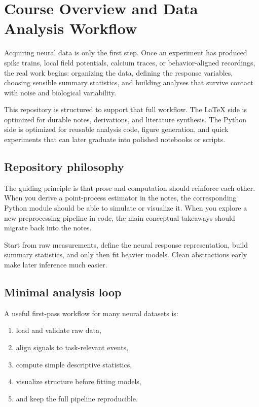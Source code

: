 \chapter{Course Overview and Data Analysis Workflow}

Acquiring neural data is only the first step. Once an experiment has produced spike trains, local field potentials, calcium traces, or behavior-aligned recordings, the real work begins: organizing the data, defining the response variables, choosing sensible summary statistics, and building analyses that survive contact with noise and biological variability.

This repository is structured to support that full workflow. The LaTeX side is optimized for durable notes, derivations, and literature synthesis. The Python side is optimized for reusable analysis code, figure generation, and quick experiments that can later graduate into polished notebooks or scripts.

\section{Repository philosophy}

The guiding principle is that prose and computation should reinforce each other. When you derive a point-process estimator in the notes, the corresponding Python module should be able to simulate or visualize it. When you explore a new preprocessing pipeline in code, the main conceptual takeaways should migrate back into the notes.

\begin{aside}
Start from raw measurements, define the neural response representation, build summary statistics, and only then fit heavier models. Clean abstractions early make later inference much easier.
\end{aside}

\section{Minimal analysis loop}

A useful first-pass workflow for many neural datasets is:
\begin{enumerate}
  \item load and validate raw data,
  \item align signals to task-relevant events,
  \item compute simple descriptive statistics,
  \item visualize structure before fitting models,
  \item and keep the full pipeline reproducible.
\end{enumerate}

